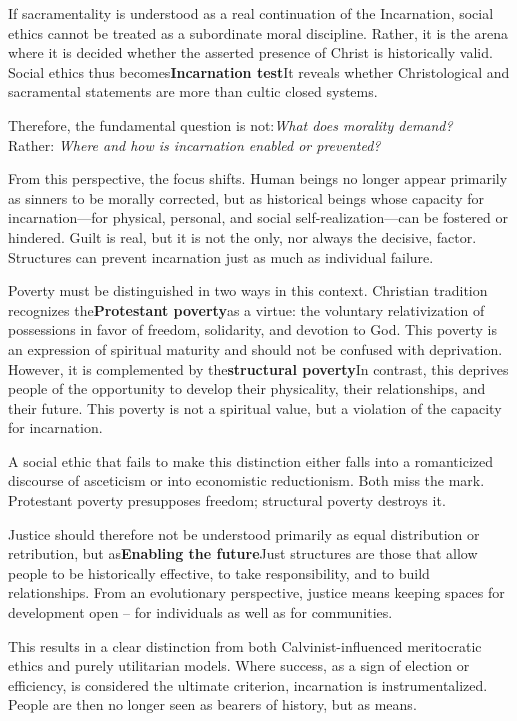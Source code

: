 \documentclass[
]{article}
\begin{document}
If sacramentality is understood as a real continuation of the Incarnation, social ethics cannot be treated as a subordinate moral discipline. Rather, it is the arena where it is decided whether the asserted presence of Christ is historically valid. Social ethics thus becomes\textbf{Incarnation test}It reveals whether Christological and sacramental statements are more than cultic closed systems.

Therefore, the fundamental question is not:\emph{What does morality demand?\\
}Rather: \emph{Where and how is incarnation enabled or prevented?}

From this perspective, the focus shifts. Human beings no longer appear primarily as sinners to be morally corrected, but as historical beings whose capacity for incarnation---for physical, personal, and social self-realization---can be fostered or hindered. Guilt is real, but it is not the only, nor always the decisive, factor. Structures can prevent incarnation just as much as individual failure.

Poverty must be distinguished in two ways in this context. Christian tradition recognizes the\textbf{Protestant poverty}as a virtue: the voluntary relativization of possessions in favor of freedom, solidarity, and devotion to God. This poverty is an expression of spiritual maturity and should not be confused with deprivation. However, it is complemented by the\textbf{structural poverty}In contrast, this deprives people of the opportunity to develop their physicality, their relationships, and their future. This poverty is not a spiritual value, but a violation of the capacity for incarnation.

A social ethic that fails to make this distinction either falls into a romanticized discourse of asceticism or into economistic reductionism. Both miss the mark. Protestant poverty presupposes freedom; structural poverty destroys it.

Justice should therefore not be understood primarily as equal distribution or retribution, but as\textbf{Enabling the future}Just structures are those that allow people to be historically effective, to take responsibility, and to build relationships. From an evolutionary perspective, justice means keeping spaces for development open -- for individuals as well as for communities.

This results in a clear distinction from both Calvinist-influenced meritocratic ethics and purely utilitarian models. Where success, as a sign of election or efficiency, is considered the ultimate criterion, incarnation is instrumentalized. People are then no longer seen as bearers of history, but as means.
\end{document}
